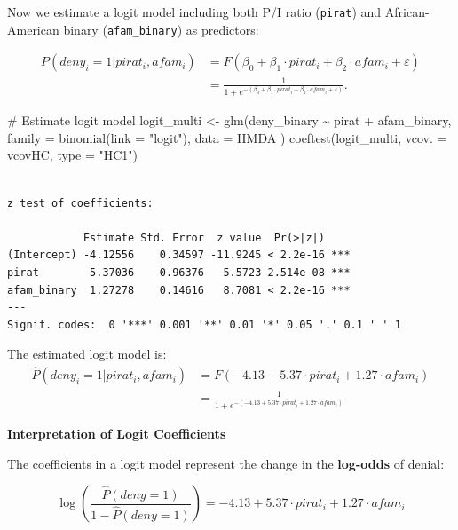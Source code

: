 \documentclass[
  12pt,
  a4paper,
]{scrbook}
\newenvironment{Shaded}{\begin{snugshade}}{\end{snugshade}}
\newcommand{\AttributeTok}[1]{\textcolor[rgb]{0.40,0.45,0.13}{#1}}
\newcommand{\CommentTok}[1]{\textcolor[rgb]{0.37,0.37,0.37}{#1}}
\newcommand{\FunctionTok}[1]{\textcolor[rgb]{0.28,0.35,0.67}{#1}}
\newcommand{\NormalTok}[1]{\textcolor[rgb]{0.00,0.23,0.31}{#1}}
\newcommand{\OtherTok}[1]{\textcolor[rgb]{0.00,0.23,0.31}{#1}}
\newcommand{\SpecialCharTok}[1]{\textcolor[rgb]{0.37,0.37,0.37}{#1}}
\newcommand{\StringTok}[1]{\textcolor[rgb]{0.13,0.47,0.30}{#1}}
\theoremstyle{plain}
\theoremstyle{definition}
\theoremstyle{remark}
\begin{document}
Now we estimate a logit model including both P/I ratio (\texttt{pirat})
and African-American binary (\texttt{afam\_binary}) as predictors:

\[
\begin{split}
P(deny_i = 1 | pirat_i, afam_i) 
&= F(\beta_0 + \beta_1 \cdot pirat_i + \beta_2 \cdot afam_i + \varepsilon) \\
&= \frac{1}{1 + e^{-(\beta_0 + \beta_1 \cdot pirat_i + \beta_2 \cdot afam_i + \varepsilon)}} .
\end{split}
\]

\begin{Shaded}
\begin{Highlighting}[]
\CommentTok{\# Estimate logit model}
\NormalTok{logit\_multi }\OtherTok{\textless{}{-}} \FunctionTok{glm}\NormalTok{(deny\_binary }\SpecialCharTok{\textasciitilde{}}\NormalTok{ pirat }\SpecialCharTok{+}\NormalTok{ afam\_binary,}
    \AttributeTok{family =} \FunctionTok{binomial}\NormalTok{(}\AttributeTok{link =} \StringTok{"logit"}\NormalTok{),}
    \AttributeTok{data =}\NormalTok{ HMDA}
\NormalTok{)}
\FunctionTok{coeftest}\NormalTok{(logit\_multi, }\AttributeTok{vcov. =}\NormalTok{ vcovHC, }\AttributeTok{type =} \StringTok{"HC1"}\NormalTok{)}
\end{Highlighting}
\end{Shaded}

\begin{verbatim}

z test of coefficients:

            Estimate Std. Error  z value  Pr(>|z|)    
(Intercept) -4.12556    0.34597 -11.9245 < 2.2e-16 ***
pirat        5.37036    0.96376   5.5723 2.514e-08 ***
afam_binary  1.27278    0.14616   8.7081 < 2.2e-16 ***
---
Signif. codes:  0 '***' 0.001 '**' 0.01 '*' 0.05 '.' 0.1 ' ' 1
\end{verbatim}

The estimated logit model is: \[
\begin{split}
\widehat{P}(deny_i = 1 | pirat_i, afam_i) &= F(-4.13 + 5.37 \cdot pirat_i + 1.27 \cdot afam_i) \\
&= \frac{1}{1 + e^{-(-4.13 + 5.37 \cdot pirat_i + 1.27 \cdot afam_i)}}
\end{split}
\]

{\textbf{Interpretation of Logit Coefficients}}

The coefficients in a logit model represent the change in the
\textbf{log-odds} of denial:

\[
\log\left(\frac{\widehat{P}(deny = 1)}{1 - \widehat{P}(deny = 1)}\right) = -4.13 + 5.37 \cdot pirat_i + 1.27 \cdot afam_i
\]
\end{document}
